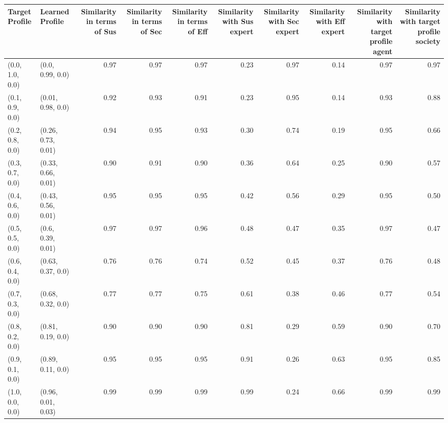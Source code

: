 \begin{tabular}{llrrrrrrrr}
\toprule
Target Profile & Learned Profile & Similarity in terms of Sus & Similarity in terms of Sec & Similarity in terms of Eff & Similarity with Sus expert & Similarity with Sec expert & Similarity with Eff expert & Similarity with target profile agent & Similarity with target profile society \\
\midrule
(0.0, 1.0, 0.0) & (0.0, 0.99, 0.0) & 0.97 & 0.97 & 0.97 & 0.23 & 0.97 & 0.14 & 0.97 & 0.97 \\
(0.1, 0.9, 0.0) & (0.01, 0.98, 0.0) & 0.92 & 0.93 & 0.91 & 0.23 & 0.95 & 0.14 & 0.93 & 0.88 \\
(0.2, 0.8, 0.0) & (0.26, 0.73, 0.01) & 0.94 & 0.95 & 0.93 & 0.30 & 0.74 & 0.19 & 0.95 & 0.66 \\
(0.3, 0.7, 0.0) & (0.33, 0.66, 0.01) & 0.90 & 0.91 & 0.90 & 0.36 & 0.64 & 0.25 & 0.90 & 0.57 \\
(0.4, 0.6, 0.0) & (0.43, 0.56, 0.01) & 0.95 & 0.95 & 0.95 & 0.42 & 0.56 & 0.29 & 0.95 & 0.50 \\
(0.5, 0.5, 0.0) & (0.6, 0.39, 0.01) & 0.97 & 0.97 & 0.96 & 0.48 & 0.47 & 0.35 & 0.97 & 0.47 \\
(0.6, 0.4, 0.0) & (0.63, 0.37, 0.0) & 0.76 & 0.76 & 0.74 & 0.52 & 0.45 & 0.37 & 0.76 & 0.48 \\
(0.7, 0.3, 0.0) & (0.68, 0.32, 0.0) & 0.77 & 0.77 & 0.75 & 0.61 & 0.38 & 0.46 & 0.77 & 0.54 \\
(0.8, 0.2, 0.0) & (0.81, 0.19, 0.0) & 0.90 & 0.90 & 0.90 & 0.81 & 0.29 & 0.59 & 0.90 & 0.70 \\
(0.9, 0.1, 0.0) & (0.89, 0.11, 0.0) & 0.95 & 0.95 & 0.95 & 0.91 & 0.26 & 0.63 & 0.95 & 0.85 \\
(1.0, 0.0, 0.0) & (0.96, 0.01, 0.03) & 0.99 & 0.99 & 0.99 & 0.99 & 0.24 & 0.66 & 0.99 & 0.99 \\
\bottomrule
\end{tabular}
